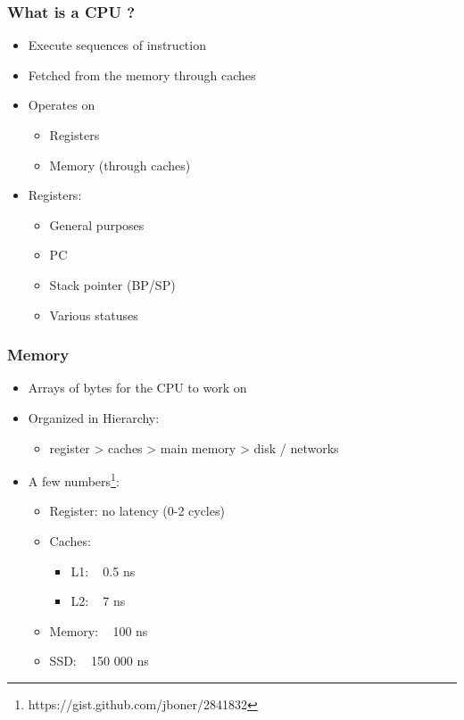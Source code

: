 \begin{frame}
  \frametitle{What is a CPU ?}

  \begin{itemize}
  \item Execute sequences of instruction
  \item Fetched from the memory through caches
  \item Operates on
    \begin{itemize}
    \item Registers
    \item Memory (through caches)
    \end{itemize}
  \item Registers:
    \begin{itemize}
    \item General purposes
    \item PC
    \item Stack pointer (BP/SP)
    \item Various statuses
    \end{itemize}
  \end{itemize}
\end{frame}



\begin{frame}
  \frametitle{Memory}

  \begin{itemize}
  \item Arrays of bytes for the CPU to work on
  \item Organized in Hierarchy:
    \begin{itemize}
    \item register > caches > main memory > disk / networks
    \end{itemize}
  \item A few numbers\footnote{https://gist.github.com/jboner/2841832}:
    \begin{itemize}
    \item Register: no latency (0-2 cycles)
    \item Caches:
      \begin{itemize}
      \item L1: ~ 0.5 ns
      \item L2: ~ 7 ns
      \end{itemize}
    \item Memory: ~ 100 ns
    \item SSD: ~ 150 000 ns
    \end{itemize}
  \end{itemize}
\end{frame}


